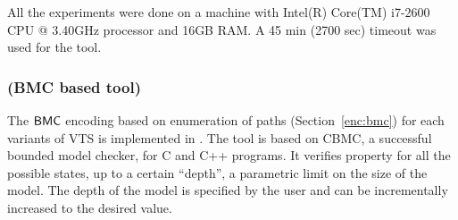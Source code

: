 All the experiments were done
on a machine with Intel(R) Core(TM) i7-2600 CPU @ 3.40GHz processor and 16GB RAM.
%
A 45 min (2700 sec) timeout was used for the tool.

%

%

\subsubsection{{\sattool} (BMC based tool)}
The $\mathsf{BMC}$ encoding based on enumeration of paths (Section~\ref{enc:bmc}) for each variants of VTS is implemented in {\sattool}.
The tool is based on CBMC, a successful bounded model checker, for C and C++ programs. 
%
%
It verifies property for all the possible states, up to a certain ``depth”, a parametric limit on the size of the model.
%
The depth of the model is specified by the user and can be incrementally increased to the desired value.
%
%

